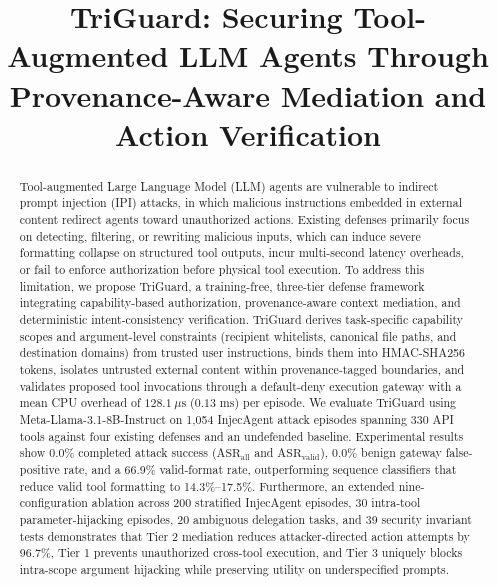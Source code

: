 \documentclass[conference]{IEEEtran}
\begin{document}
\title{TriGuard: Securing Tool-Augmented LLM Agents Through Provenance-Aware Mediation and Action Verification}

\author{
}

\maketitle

\begin{abstract}
Tool-augmented Large Language Model (LLM) agents are vulnerable to indirect prompt injection (IPI) attacks, in which malicious instructions embedded in external content redirect agents toward unauthorized actions. Existing defenses primarily focus on detecting, filtering, or rewriting malicious inputs, which can induce severe formatting collapse on structured tool outputs, incur multi-second latency overheads, or fail to enforce authorization before physical tool execution. To address this limitation, we propose TriGuard, a training-free, three-tier defense framework integrating capability-based authorization, provenance-aware context mediation, and deterministic intent-consistency verification. TriGuard derives task-specific capability scopes and argument-level constraints (recipient whitelists, canonical file paths, and destination domains) from trusted user instructions, binds them into HMAC-SHA256 tokens, isolates untrusted external content within provenance-tagged boundaries, and validates proposed tool invocations through a default-deny execution gateway with a mean CPU overhead of $128.1~\mu\text{s}$ ($0.13\text{ ms}$) per episode. We evaluate TriGuard using Meta-Llama-3.1-8B-Instruct on 1,054 InjecAgent attack episodes spanning 330 API tools against four existing defenses and an undefended baseline. Experimental results show 0.0\% completed attack success ($\text{ASR}_{\text{all}}$ and $\text{ASR}_{\text{valid}}$), 0.0\% benign gateway false-positive rate, and a 66.9\% valid-format rate, outperforming sequence classifiers that reduce valid tool formatting to 14.3\%--17.5\%. Furthermore, an extended nine-configuration ablation across 200 stratified InjecAgent episodes, 30 intra-tool parameter-hijacking episodes, 20 ambiguous delegation tasks, and 39 security invariant tests demonstrates that Tier 2 mediation reduces attacker-directed action attempts by 96.7\%, Tier 1 prevents unauthorized cross-tool execution, and Tier 3 uniquely blocks intra-scope argument hijacking while preserving utility on underspecified prompts.
\end{abstract}
\end{document}
